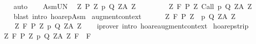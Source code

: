 \begin{isabellebody}
\ \ \isamarkupfalse%
\ auto\isanewline
\ \ \isamarkupfalse%
%
\endisatagproof
{\isafoldproof}%
%
\isadelimproof
\isanewline
%
\endisadelimproof
\isanewline
{}\isamarkupfalse%
\ AsmUN{\isacharcolon}\isanewline
\ \ {\isachardoublequoteopen}{\isacharparenleft}{\isasymUnion}Z{\isachardot}\ {\isacharbraceleft}{\isacharparenleft}P\ Z{\isacharcomma}\ p{\isacharcomma}\ Q\ Z{\isacharcomma}A\ Z{\isacharparenright}{\isacharbraceright}{\isacharparenright}\ {\isasymsubseteq}\ {\isasymTheta}\ \isanewline
\ \ {\isasymLongrightarrow}\ \isanewline
\ \ {\isasymforall}Z{\isachardot}\ {\isasymGamma}{\isacharcomma}{\isasymTheta}{\isasymturnstile}\isactrlbsub {\isacharslash}F\isactrlesub \ {\isacharparenleft}P\ Z{\isacharparenright}\ {\isacharparenleft}Call\ p{\isacharparenright}\ {\isacharparenleft}Q\ Z{\isacharparenright}{\isacharcomma}{\isacharparenleft}A\ Z{\isacharparenright}{\isachardoublequoteclose}\isanewline
%
\isadelimproof
\ \ %
\endisadelimproof
%
\isatagproof
{}\isamarkupfalse%
\ {\isacharparenleft}blast\ intro{\isacharcolon}\ hoarep{\isachardot}Asm{\isacharparenright}%
\endisatagproof
{\isafoldproof}%
%
\isadelimproof
\isanewline
%
\endisadelimproof
\isanewline
{}\isamarkupfalse%
\ augment{\isacharunderscore}context{\isacharprime}{\isacharcolon}\ \isanewline
\ \ {\isachardoublequoteopen}{\isasymlbrakk}{\isasymTheta}\ {\isasymsubseteq}\ {\isasymTheta}{\isacharprime}{\isacharsemicolon}\ {\isasymforall}Z{\isachardot}\ {\isasymGamma}{\isacharcomma}{\isasymTheta}{\isasymturnstile}\isactrlbsub {\isacharslash}F\isactrlesub \ {\isacharparenleft}P\ Z{\isacharparenright}\ \ p\ {\isacharparenleft}Q\ Z{\isacharparenright}{\isacharcomma}{\isacharparenleft}A\ Z{\isacharparenright}{\isasymrbrakk}\ \isanewline
\ \ \ {\isasymLongrightarrow}\ {\isasymforall}Z{\isachardot}\ {\isasymGamma}{\isacharcomma}{\isasymTheta}{\isacharprime}{\isasymturnstile}\isactrlbsub {\isacharslash}F\isactrlesub \ {\isacharparenleft}P\ Z{\isacharparenright}\ p\ {\isacharparenleft}Q\ Z{\isacharparenright}{\isacharcomma}{\isacharparenleft}A\ Z{\isacharparenright}{\isachardoublequoteclose}\isanewline
%
\isadelimproof
\ \ %
\endisadelimproof
%
\isatagproof
{}\isamarkupfalse%
\ {\isacharparenleft}iprover\ intro{\isacharcolon}\ hoare{\isacharunderscore}augment{\isacharunderscore}context{\isacharparenright}%
\endisatagproof
{\isafoldproof}%
%
\isadelimproof
\isanewline
%
\endisadelimproof
\isanewline
\isanewline
{}\isamarkupfalse%
\ hoarep{\isacharunderscore}strip{\isacharcolon}\ \isanewline
\ {\isachardoublequoteopen}{\isasymlbrakk}{\isasymforall}Z{\isachardot}\ {\isasymGamma}{\isacharcomma}{\isacharbraceleft}{\isacharbraceright}{\isasymturnstile}\isactrlbsub {\isacharslash}F\isactrlesub \ {\isacharparenleft}P\ Z{\isacharparenright}\ p\ {\isacharparenleft}Q\ Z{\isacharparenright}{\isacharcomma}{\isacharparenleft}A\ Z{\isacharparenright}{\isacharsemicolon}\ F{\isacharprime}\ {\isasymsubseteq}\ {\isacharminus}F{\isasymrbrakk}\ {\isasymLongrightarrow}\ \isanewline

\end{isabellebody}
